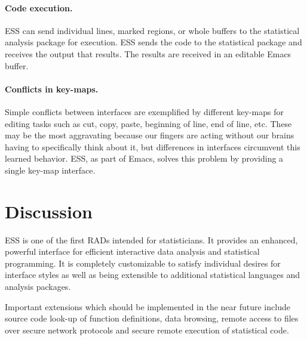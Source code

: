 \documentclass{article}
\newcommand*{\SAS}{\textsc{SAS}$^{\mbox{\scriptsize\textregistered}}$}
\newcommand*{\Splus}{\textsc{S-Plus}}
\newcommand*{\XLispStat}{\textsc{XLispStat}}
\newcommand{\stexttt}[1]{{\small\texttt{#1}}}
\begin{document}

\paragraph{Code execution.}
ESS can send individual lines, marked regions, or whole buffers to the 
statistical analysis package for execution.  ESS sends the code to
the statistical package and receives the output that results.   The results
are received in an editable Emacs buffer. 


\paragraph{Conflicts in key-maps.}
\label{sec:confl-keym}

Simple conflicts between interfaces are exemplified by different
key-maps for editing tasks such as cut, copy, paste, beginning of
line, end of line, etc.  These may be the most aggravating
because our fingers are acting without our brains having to
specifically think about it, but differences in interfaces
circumvent this learned behavior.  ESS, as part of Emacs, 
solves this problem by providing a single key-map interface.

\section{Discussion}
\label{sec:discussion}



ESS is one of the first RADs intended for statisticians.  It provides
an enhanced, powerful interface for efficient interactive data
analysis and statistical programming.  It is completely customizable
to satisfy individual desires for interface styles as well as being
extensible to additional statistical languages and analysis packages.

Important extensions which should be implemented in the near future 
include source code look-up of function definitions, data browsing, 
remote access to files over secure network protocols and secure remote 
execution of statistical code.



\end{document}
